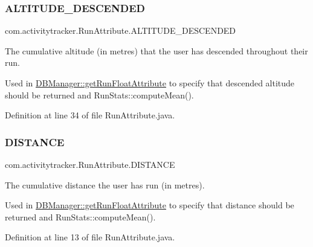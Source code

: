 \subsubsection{\texorpdfstring{A\+L\+T\+I\+T\+U\+D\+E\+\_\+\+D\+E\+S\+C\+E\+N\+D\+ED}{ALTITUDE\_DESCENDED}}
{\footnotesize\ttfamily com.\+activitytracker.\+Run\+Attribute.\+A\+L\+T\+I\+T\+U\+D\+E\+\_\+\+D\+E\+S\+C\+E\+N\+D\+ED}

The cumulative altitude (in metres) that the user has descended throughout their run.

Used in \mbox{\hyperlink{classcom_1_1activitytracker_1_1_d_b_manager_a666452f1e5862f90c06b0beb9a9fcfdd}{D\+B\+Manager\+::get\+Run\+Float\+Attribute}} to specify that descended altitude should be returned and Run\+Stats\+::compute\+Mean(). 

Definition at line 34 of file Run\+Attribute.\+java.

\mbox{\label{enumcom_1_1activitytracker_1_1_run_attribute_a90ee541e68e458a0bb3f5ea45fd46ec0}} 
\subsubsection{\texorpdfstring{D\+I\+S\+T\+A\+N\+CE}{DISTANCE}}
{\footnotesize\ttfamily com.\+activitytracker.\+Run\+Attribute.\+D\+I\+S\+T\+A\+N\+CE}

The cumulative distance the user has run (in metres).

Used in \mbox{\hyperlink{classcom_1_1activitytracker_1_1_d_b_manager_a666452f1e5862f90c06b0beb9a9fcfdd}{D\+B\+Manager\+::get\+Run\+Float\+Attribute}} to specify that distance should be returned and Run\+Stats\+::compute\+Mean(). 

Definition at line 13 of file Run\+Attribute.\+java.

\mbox{\label{enumcom_1_1activitytracker_1_1_run_attribute_a7adf133b2a62f1f99ffc2adfb7097ec9}} 
